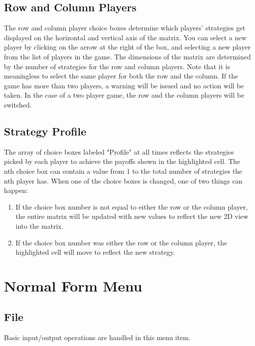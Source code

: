 \subsection{Row and Column Players} The row and column player choice boxes
determine which players' strategies get displayed on the horizontal and
vertical axis of the matrix.  You can select a new player by clicking on the 
arrow at the right of the box, and selecting a new player from the 
list of players in the game.  The dimensions of the matrix are
determined by the number of strategies for the row and column players.
Note that it is meaningless to select the same player for both the row and
the column.  If the game has more than two players, a warning will be
issued and no action will be taken.  In the case of a two player game, the
row and the column players will be switched.

\subsection{Strategy Profile}
The array of choice boxes labeled "Profile" at all times reflects the
strategies picked by each player to achieve the payoffs shown in the
highlighted cell.  The nth choice box can contain a value from 1 to the
total number of strategies the nth player has.  When one of the choice
boxes is changed, one of two things can happen:

\begin{enumerate}
\item If the choice box number is not equal to either the row or
the column player, the entire matrix will be updated with new values to
reflect the new 2D view into the matrix.
\item If the choice box number was either the row or the column player,
the highlighted cell will move to reflect the new strategy.
\end{enumerate}

\section{Normal Form Menu}

\subsection{File}\label{nffile}

Basic input/output operations are handled in this menu item.  

